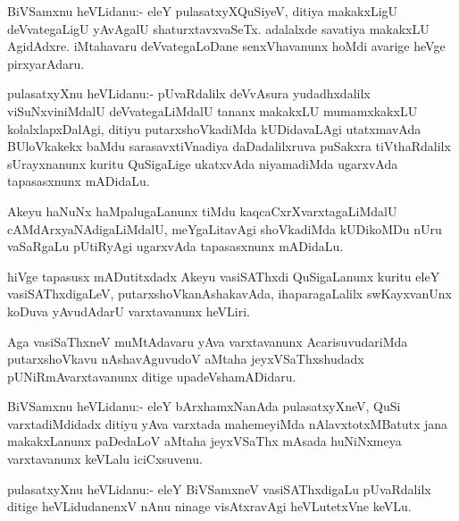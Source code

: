 \documentclass{article}
\begin{document}
%
%


\begin{mn}%
BiVSamxnu heVLidanu:- eleY pulasatxyXQuSiyeV, ditiya makakxLigU
deVvategaLigU yAvAgalU shaturxtavxvaSeTx. adalalxde savatiya makakxLU
AgidAdxre. iMtahavaru deVvategaLoDane senxVhavanunx hoMdi avarige
heVge pirxyarAdaru.
\end{mn}

\begin{mn}%
pulasatxyXnu heVLidanu:- pUvaRdalilx deVvAsura yudadhxdalilx
viSuNxviniMdalU deVvategaLiMdalU tananx makakxLU mumamxkakxLU
kolalxlapxDalAgi, ditiyu putarxshoVkadiMda kUDidavaLAgi utatxmavAda
BUloVkakekx baMdu sarasavxtiVnadiya daDadalilxruva puSakxra
tiVthaRdalilx sUrayxnanunx kuritu QuSigaLige ukatxvAda niyamadiMda
ugarxvAda tapasasxnunx mADidaLu.
\end{mn}

\begin{mn}%
Akeyu haNuNx haMpalugaLanunx tiMdu kaqcaCxrXvarxtagaLiMdalU
cAMdArxyaNAdigaLiMdalU, meYgaLitavAgi shoVkadiMda kUDikoMDu nUru
vaSaRgaLu pUtiRyAgi ugarxvAda tapasasxnunx mADidaLu.
\end{mn}

\begin{mn}
hiVge tapasusx mADutitxdadx Akeyu vasiSAThxdi QuSigaLanunx kuritu eleY
vasiSAThxdigaLeV, putarxshoVkanAshakavAda, ihaparagaLalilx
swKayxvanUnx koDuva yAvudAdarU varxtavanunx heVLiri.
\end{mn}

\begin{mn}
Aga vasiSaThxneV muMtAdavaru yAva varxtavanunx AcarisuvudariMda
putarxshoVkavu nAshavAguvudoV aMtaha jeyxVSaThxshudadx
pUNiRmAvarxtavanunx ditige upadeVshamADidaru.
\end{mn}

\begin{mn}
BiVSamxnu heVLidanu:- eleY bArxhamxNanAda pulasatxyXneV, QuSi
varxtadiMdidadx ditiyu yAva varxtada mahemeyiMda nAlavxtotxMBatutx
jana makakxLanunx paDedaLoV aMtaha jeyxVSaThx mAsada huNiNxmeya
varxtavanunx keVLalu iciCxsuvenu.
\end{mn}

\begin{mn}
pulasatxyXnu heVLidanu:- eleY BiVSamxneV vasiSAThxdigaLu pUvaRdalilx
ditige heVLidudanenxV nAnu ninage visAtxravAgi heVLutetxVne keVLu.
\end{mn}
\end{document}
